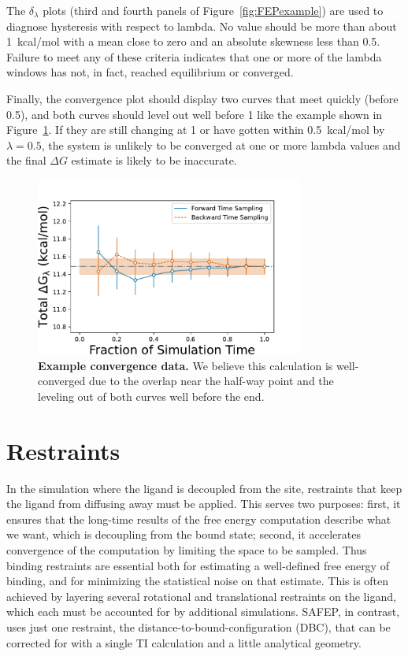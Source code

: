\documentclass[9pt,tutorial]{Styling/livecoms}
\begin{document}
The $\delta_\lambda$ plots (third and fourth panels of Figure~\ref{fig:FEPexample}) are used to diagnose hysteresis with respect to lambda. No value should be more than about 1~kcal/mol with a mean close to zero and an absolute skewness less than 0.5. Failure to meet any of these criteria indicates that one or more of the lambda windows has not, in fact, reached equilibrium or converged.

Finally, the convergence plot should display two curves that meet quickly (before 0.5), and both curves should level out well before 1 like the example shown in Figure~\ref{fig:convergenceExample}. If they are still changing at 1 or have gotten within 0.5~kcal/mol by $\lambda=0.5$, the system is unlikely to be converged at one or more lambda values and the final $\Delta G$ estimate is likely to be inaccurate.

\begin{figure}[htb]
    \centering
    \includegraphics[width=250pt]{good_convergence}
    \caption{\textbf{Example convergence data.} We believe this calculation is well-converged due to the overlap near the half-way point and the leveling out of both curves well before the end. 
    }\label{fig:convergenceExample}
\end{figure}

\section{Restraints}\label{app:restraints}
In the simulation where the ligand is decoupled from the site, restraints that keep the ligand from diffusing away must be applied. This serves two purposes:\cite{Hermans1986} first, it ensures that the long-time results of the free energy computation describe what we want, which is decoupling from the bound state; second, it accelerates convergence of the computation by limiting the space to be sampled.
Thus binding restraints are essential both for estimating a well-defined free energy of binding, and for minimizing the statistical noise on that estimate.
This is often achieved by layering several rotational and translational restraints on the ligand, which each must be accounted for by additional simulations\cite{Hermans1997, Gilson1997, Boresch2003, Hamelberg2004, Woo2005, Deng2006}.
SAFEP, in contrast, uses just one restraint, the distance-to-bound-configuration (DBC), that can be corrected for with a single TI calculation and a little analytical geometry\cite{Salari2018}.
\end{document}
